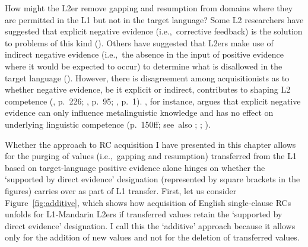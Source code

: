 How might the L2er remove gapping and resumption from domains where they are permitted in the L1 but not in the target language? Some L2 researchers have suggested that explicit negative evidence (i.e.,~corrective feedback) is the solution to problems of this kind (\cite{bley-vroman1990,carroll.swain1993,ellis.etal2006,white1987,white1991}). Others have suggested that L2ers make use of indirect negative evidence (i.e.,~the absence in the input of positive evidence where it would be expected to occur) to determine what is disallowed in the target language (\cite{archibald1993,gass1988,plough1994}). However, there is disagreement among acquisitionists as to whether negative evidence, be it explicit or indirect, contributes to shaping L2 competence (\cite{gass2003}, p.~226; \cite{li.vuono2019}, p.~95; \cite{sylte2021}, p.~1). \textcite{schwartz1993}, for instance, argues that explicit negative evidence can only influence metalinguistic knowledge and has no effect on underlying linguistic competence (p.~150ff; see~also \cite{schwartz1986,schwartz1987}; \cite{schwartz.gubala-ryzak1992}; \cite{truscott1998}).

Whether the approach to RC acquisition I have presented in this chapter allows for the purging of values (i.e.,~gapping and resumption) transferred from the L1 based on target-language positive evidence alone hinges on whether the `supported by direct evidence' designation (represented by square brackets in the figures) carries over as part of L1 transfer. First, let us consider Figure~\ref{fig:additive}, which shows how acquisition of English single-clause RCs unfolds for L1-Mandarin L2ers if transferred values retain the `supported by direct evidence' designation. I call this the `additive' approach because it allows only for the addition of new values and not for the deletion of transferred values.


